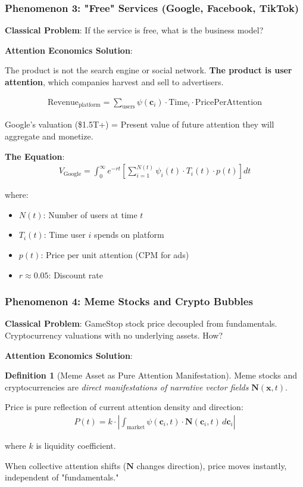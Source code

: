 \documentclass[11pt,a4paper]{article}
\theoremstyle{definition}
\newtheorem{definition}{Definition}[section]
\theoremstyle{remark}
\newcommand{\cc}{\mathbf{c}}
\begin{document}
\subsubsection{Phenomenon 3: "Free" Services (Google, Facebook, TikTok)}

\textbf{Classical Problem}: If the service is free, what is the business model?

\textbf{Attention Economics Solution}:

The product is not the search engine or social network. \textbf{The product is user attention}, which companies harvest and sell to advertisers.

\begin{align}
\text{Revenue}_{\text{platform}} = \sum_{\text{users}} \psi(\cc_i) \cdot \text{Time}_i \cdot \text{PricePerAttention}
\end{align}

Google's valuation (\$1.5T+) = Present value of future attention they will aggregate and monetize.

\textbf{The Equation}:
\begin{align}
V_{\text{Google}} = \int_0^\infty e^{-rt} \left[\sum_{i=1}^{N(t)} \psi_i(t) \cdot T_i(t) \cdot p(t)\right] dt
\end{align}

where:
\begin{itemize}
    \item \(N(t)\): Number of users at time \(t\)
    \item \(T_i(t)\): Time user \(i\) spends on platform
    \item \(p(t)\): Price per unit attention (CPM for ads)
    \item \(r \approx 0.05\): Discount rate
\end{itemize}

\subsubsection{Phenomenon 4: Meme Stocks and Crypto Bubbles}

\textbf{Classical Problem}: GameStop stock price decoupled from fundamentals. Cryptocurrency valuations with no underlying assets. How?

\textbf{Attention Economics Solution}:

\begin{definition}[Meme Asset as Pure Attention Manifestation]
Meme stocks and cryptocurrencies are \textit{direct manifestations of narrative vector fields} \(\mathbf{N}(\mathbf{x}, t)\).

Price is pure reflection of current attention density and direction:
\begin{align}
P(t) = k \cdot \left| \int_{\text{market}} \psi(\cc_i, t) \cdot \mathbf{N}(\cc_i, t) \, d\cc_i \right|
\end{align}

where \(k\) is liquidity coefficient.

When collective attention shifts (\(\mathbf{N}\) changes direction), price moves instantly, independent of "fundamentals."
\end{definition}
\end{document}
